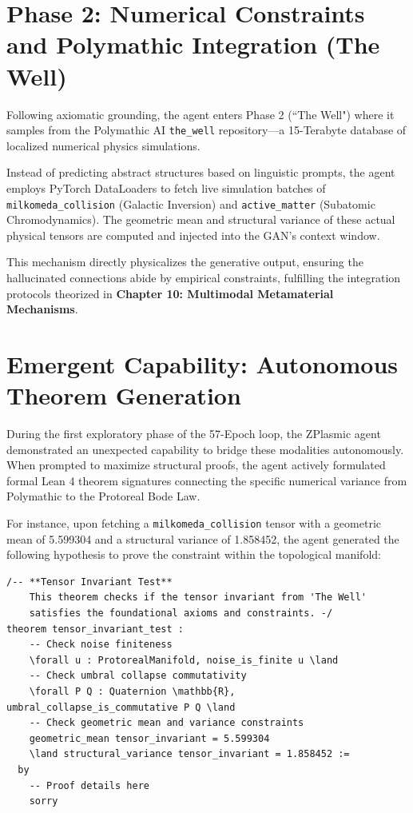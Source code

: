 \section{Phase 2: Numerical Constraints and Polymathic Integration (The Well)}
Following axiomatic grounding, the agent enters Phase 2 (``The Well") where it samples from the Polymathic AI \texttt{the\_well} repository---a 15-Terabyte database of localized numerical physics simulations.

Instead of predicting abstract structures based on linguistic prompts, the agent employs PyTorch DataLoaders to fetch live simulation batches of \texttt{milkomeda\_collision} (Galactic Inversion) and \texttt{active\_matter} (Subatomic Chromodynamics). The geometric mean and structural variance of these actual physical tensors are computed and injected into the GAN's context window. 

This mechanism directly physicalizes the generative output, ensuring the hallucinated connections abide by empirical constraints, fulfilling the integration protocols theorized in \textbf{Chapter 10: Multimodal Metamaterial Mechanisms}.

\section{Emergent Capability: Autonomous Theorem Generation}
During the first exploratory phase of the 57-Epoch loop, the ZPlasmic agent demonstrated an unexpected capability to bridge these modalities autonomously. When prompted to maximize structural proofs, the agent actively formulated formal Lean 4 theorem signatures connecting the specific numerical variance from Polymathic to the Protoreal Bode Law.

For instance, upon fetching a \texttt{milkomeda\_collision} tensor with a geometric mean of 5.599304 and a structural variance of 1.858452, the agent generated the following hypothesis to prove the constraint within the topological manifold:

\begin{verbatim}
/-- **Tensor Invariant Test**
    This theorem checks if the tensor invariant from 'The Well'
    satisfies the foundational axioms and constraints. -/
theorem tensor_invariant_test :
    -- Check noise finiteness
    \forall u : ProtorealManifold, noise_is_finite u \land
    -- Check umbral collapse commutativity
    \forall P Q : Quaternion \mathbb{R}, umbral_collapse_is_commutative P Q \land
    -- Check geometric mean and variance constraints
    geometric_mean tensor_invariant = 5.599304 
    \land structural_variance tensor_invariant = 1.858452 :=
  by
    -- Proof details here
    sorry
\end{verbatim}

